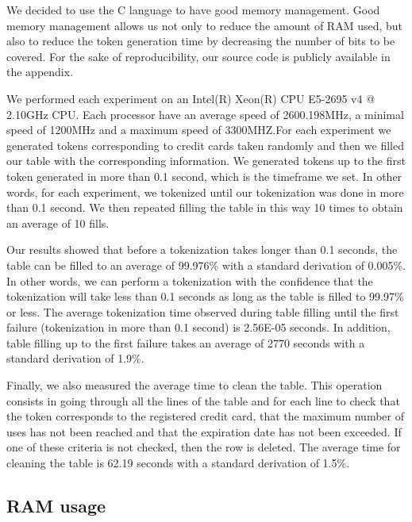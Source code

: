 \documentclass{llncs}
\newcommand{\ab}[1]{\emph{\bf \color{blue}~[Agathe: #1]}}
\begin{document}
We decided to use the C language to have good memory management. Good memory management allows us not only to reduce the amount of RAM used, but also to reduce the token generation time by decreasing the number of bits to be covered. For the sake of reproducibility, our source code is publicly available in the appendix.
\par We performed each experiment on an Intel(R) Xeon(R) CPU E5-2695 v4 @ 2.10GHz CPU. Each processor have an average speed of 2600.198MHz, a   minimal speed of 1200MHz and a maximum speed of 3300MHZ.For each experiment we generated tokens corresponding to credit cards taken randomly and then we filled our table with the corresponding information. We generated tokens up to the first token generated in more than 0.1 second, which is the timeframe we set. In other words, for each experiment, we tokenized until our tokenization was done in more than 0.1 second. We then repeated filling the table in this way 10 times to obtain an average of 10 fills.
\par Our results showed that before a tokenization takes longer than 0.1 seconds, the table can be filled to an average of 99.976\% with a standard derivation of 0.005\%. In other words, we can perform a tokenization with the confidence that the tokenization will take less than 0.1 seconds as long as the table is filled to 99.97\% or less. The average tokenization time observed during table filling until the first failure (tokenization in more than 0.1 second) is 2.56E-05 seconds. In addition, table filling up to the first failure takes an average of 2770 seconds with a standard derivation of 1.9\%.
\par Finally, we also measured the average time to clean the table. This operation consists in going through all the lines of the table and for each line to check that the token corresponds to the registered credit card, that the maximum number of uses has not been reached and that the expiration date has not been exceeded.  If one of these criteria is not checked, then the row is deleted. The average time for cleaning the table is 62.19 seconds with a standard derivation of 1.5\%.

\subsection{RAM usage} 
\end{document}
